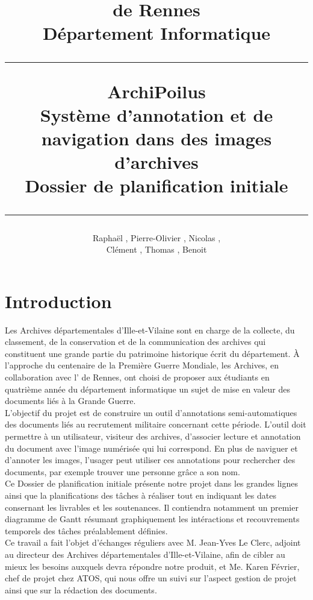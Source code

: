 \documentclass[a4paper]{article}
\title{\bsc{INSA} de Rennes \\ Département Informatique \\ \bigskip \hrule \bigskip ArchiPoilus \\ \bigskip Système d'annotation et de navigation dans des images d'archives \\ \bigskip Dossier de planification initiale \bigskip \hrule}
\author{Raphaël \bsc{Baron}, Pierre-Olivier \bsc{Bouteau}, Nicolas \bsc{Charpentier}, \\ Clément \bsc{Leboullenger}, Thomas \bsc{François}, Benoit \bsc{Travers}}
\begin{document}
\maketitle
\thispagestyle{empty}

\newpage
\tableofcontents
\thispagestyle{empty}

\newpage
{}
{}
\section*{Introduction}

	Les Archives départementales d'Ille-et-Vilaine sont en charge de la collecte, du classement, de la conservation et de la communication des archives qui constituent une grande partie du patrimoine historique écrit du département. 
\`A l'approche du centenaire de la Première Guerre Mondiale, les Archives, en collaboration avec l' de Rennes, ont choisi de proposer aux étudiants en quatrième année du département informatique un sujet de mise en valeur des documents li\'es \`a la Grande Guerre.\\

	L'objectif du projet est de construire un outil d'annotations semi-auto\-matiques des documents liés au recrutement militaire concernant cette période. L'outil doit permettre à un utilisateur, visiteur des archives, d'associer lecture et annotation du document avec l'image numérisée qui lui correspond. En plus de naviguer et d'annoter les images, l'usager peut utiliser ces annotations pour rechercher des documents, par exemple trouver une personne grâce a son nom.\\
	
	Ce Dossier de planification initiale présente notre projet dans les grandes lignes ainsi que la planifications des tâches à réaliser tout en indiquant les dates consernant les livrables et les soutenances. Il contiendra notamment un premier diagramme de Gantt résumant graphiquement les intéractions et recouvrements temporels des tâches préalablement définies.\\
	
	Ce travail a fait l'objet d'échanges réguliers avec M. Jean-Yves Le Clerc, adjoint au directeur des Archives départementales d’Ille-et-Vilaine, afin de cibler au mieux les besoins auxquels devra répondre notre produit, et Me. Karen Février, chef de projet chez ATOS, qui nous offre un suivi sur l'aspect gestion de projet ainsi que sur la rédaction des documents.
\end{document}
